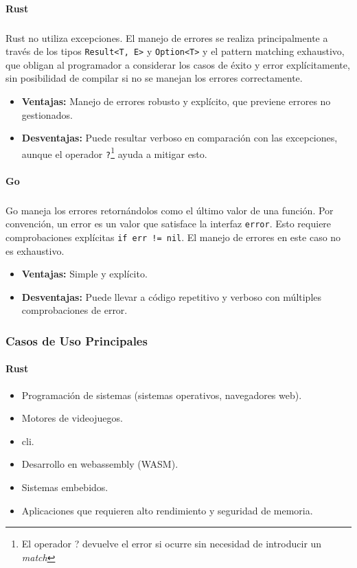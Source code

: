 \paragraph{Rust}
\subparagraph{}
Rust no utiliza excepciones. El manejo de errores se realiza principalmente a través de los tipos \texttt{Result<T, E>} y \texttt{Option<T>} y el pattern matching exhaustivo, que obligan al programador a considerar los casos de éxito y error explícitamente, sin posibilidad de compilar si no se manejan los errores correctamente.
\begin{itemize}
    \item \textbf{Ventajas:} Manejo de errores robusto y explícito, que previene errores no gestionados.
    \item \textbf{Desventajas:} Puede resultar verboso en comparación con las excepciones, aunque el operador \texttt{?}\footnote{El operador ? devuelve el error si ocurre sin necesidad de introducir un \textit{match}} ayuda a mitigar esto.
\end{itemize}

\paragraph{Go}
\subparagraph{}
Go maneja los errores retornándolos como el último valor de una función. Por convención, un error es un valor que satisface la interfaz \texttt{error}. Esto requiere comprobaciones explícitas \texttt{if err != nil}.
El manejo de errores en este caso no es exhaustivo.
\begin{itemize}
    \item \textbf{Ventajas:} Simple y explícito.
    \item \textbf{Desventajas:} Puede llevar a código repetitivo y verboso con múltiples comprobaciones de error.
\end{itemize}

\subsubsection{Casos de Uso Principales}
\paragraph{Rust}

\begin{itemize}
    \item Programación de sistemas (sistemas operativos, navegadores web).
    \item Motores de videojuegos.
    \item \acrfull{cli}.
    \item Desarrollo en \gls{webassembly} (WASM).
    \item Sistemas embebidos.
    \item Aplicaciones que requieren alto rendimiento y seguridad de memoria.
\end{itemize}

